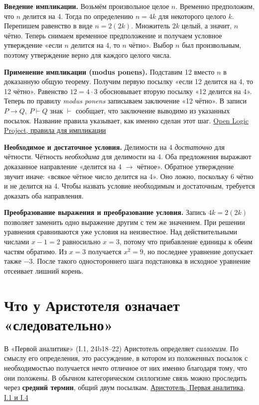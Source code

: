\documentclass[12pt,a4paper]{article}
\begin{document}
\textbf{Введение импликации.} Возьмём произвольное целое \(n\). Временно предположим, что \(n\) делится на 4. Тогда по определению \(n=4k\) для некоторого целого \(k\). Перепишем равенство в виде \(n=2(2k)\). Множитель \(2k\) целый, а значит, \(n\) чётно. Теперь снимаем временное предположение и получаем условное утверждение «если \(n\) делится на 4, то \(n\) чётно». Выбор \(n\) был произвольным, поэтому утверждение верно для каждого целого числа.

\textbf{Применение импликации (modus ponens).} Подставим 12 вместо \(n\) в доказанную общую теорему. Получим первую посылку «если 12 делится на 4, то 12 чётно». Равенство \(12=4\cdot3\) обосновывает вторую посылку «12 делится на 4». Теперь по правилу \emph{modus ponens} записываем заключение «12 чётно». В записи \textbf{\(P\to Q,\ P\vdash Q\)} знак \(\vdash\) сообщает, что заключение выводимо из указанных посылок. Название правила указывает, как именно сделан этот шаг. \href{https://builds.openlogicproject.org/content/first-order-logic/natural-deduction/propositional-rules.pdf}{Open Logic Project, правила для импликации}

\textbf{Необходимое и достаточное условия.} Делимости на 4 \emph{достаточно} для чётности. Чётность \emph{необходима} для делимости на 4. Оба предложения выражают доказанное направление «делится на 4 \(\to\) чётное». Обратное утверждение звучит иначе: «всякое чётное число делится на 4». Оно ложно, поскольку 6 чётно и не делится на 4. Чтобы назвать условие необходимым и достаточным, требуется доказать оба направления.

\textbf{Преобразование выражения и преобразование условия.} Запись \(4k=2(2k)\) позволяет заменить одно выражение другим с тем же значением. При решении уравнения сравниваются уже условия на неизвестное. Над действительными числами \(x-1=2\) равносильно \(x=3\), потому что прибавление единицы к обеим частям обратимо. Из \(x=3\) получается \(x^2=9\), но последнее уравнение допускает также \(-3\). После такого одностороннего шага подстановка в исходное уравнение отсеивает лишний корень.

\section{Что у Аристотеля означает «следовательно»}

В «Первой аналитике» (I.1, 24b18–22) Аристотель определяет \emph{силлогизм}. По смыслу его определения, это рассуждение, в котором из положенных посылок с необходимостью получается нечто отличное от них именно благодаря тому, что они положены. В обычном категорическом силлогизме связь можно проследить через \textbf{средний термин}, общий двум посылкам. \href{https://classics.mit.edu/Aristotle/prior.1.i.html}{Аристотель, Первая аналитика, I.1 и I.4}
\end{document}
